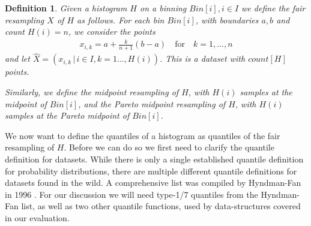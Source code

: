 \documentclass{article}
\theoremstyle{plain}
\newtheorem{definition}{Definition}[section]
\theoremstyle{remark}
\newcommand{\qtext}[1]{\quad\text{#1}\quad} %
\begin{document}
\begin{definition}
  Given a histogram $H$ on a binning $Bin[i], i \in I$ we define the fair resampling $X$ of $H$ as follows.
  For each bin $Bin[i]$, with boundaries $a,b$ and count $H(i)=n$, we consider the points
  \begin{align*}
    x_{i,k} = a + \frac{k}{n+1} (b-a) \qtext{for} k=1,\dots,n
  \end{align*}
  and let $\hat{X} = (x_{i,k} \,|\, i \in I, k = 1\dots,H(i))$. This is a dataset with $count[H]$ points.

  Similarly, we define the midpoint resampling of $H$, with $H(i)$ samples at the midpoint of $Bin[i]$,
  and the Pareto midpoint resampling of $H$, with $H(i)$ samples at the Pareto midpoint of $Bin[i]$.
\end{definition}

We now want to define the quantiles of a histogram as quantiles of the fair resampling of $H$.
Before we can do so we first need to clarify the quantile definition for datasets.
While there is only a single established quantile definition for probability distributions, there
are multiple different quantile definitions for datasets found in the wild.
A comprehensive list was compiled by Hyndman-Fan in 1996 \cite{HF1996}.
For our discussion we will need type-1/7 quantiles from the Hyndman-Fan list,
as well as two other quantile functions, used by data-structures covered in our evaluation.
\end{document}

